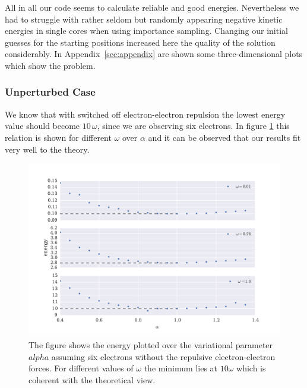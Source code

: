 All in all our code seems to calculate reliable and good energies. Nevertheless we had to struggle with rather seldom but randomly appearing negative kinetic energies in single cores when using importance sampling. Changing our initial guesses for the starting positions increased here the quality of the solution considerably. In Appendix~\ref{sec:appendix} are shown some three-dimensional plots which show the problem. 
\FloatBarrier
\subsubsection{Unperturbed Case}
We know that with switched off electron-electron repulsion the lowest energy value should become $10\,\omega$, since we are observing six electrons. In figure \ref{fig:six_electron_unperturbed} this relation is shown for different $\omega$ over $\alpha$ and it can be observed that our results fit very well to the theory. 
\begin{figure}[htbp]
    \centering
    \includegraphics[scale=0.7]{six_electron_unperturbed}
    \caption{The figure shows the energy plotted over the variational parameter $alpha$ assuming six electrons without the repulsive electron-electron forces. For different values of $\omega$ the minimum lies at $10\omega$ which is coherent with the theoretical view.}
    \label{fig:six_electron_unperturbed}
\end{figure}

